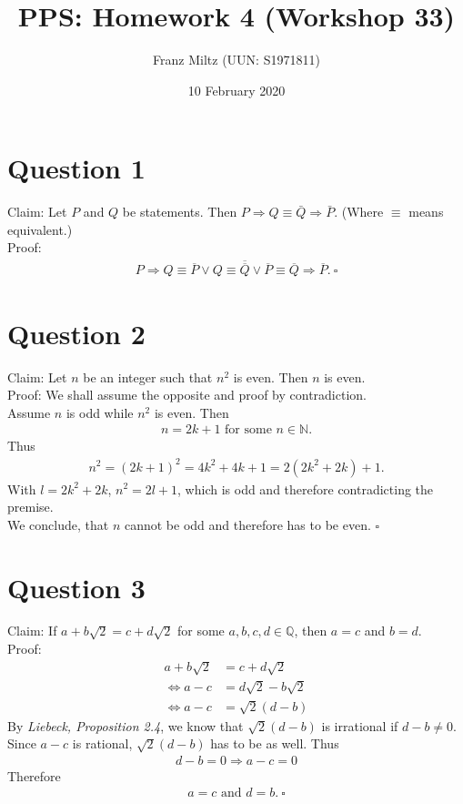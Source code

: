 \documentclass{article}
\title{PPS: Homework 4 (Workshop 33)}
\author{Franz Miltz (UUN: S1971811)}
\date{10 February 2020}
\begin{document}
\maketitle
\section*{Question 1}
Claim: Let $P$ and $Q$ be statements. Then $P\Rightarrow Q\equiv \bar{Q}\Rightarrow \bar{P}$. (Where $\equiv$ means equivalent.)\\
Proof:
\begin{align*}
	P\Rightarrow Q\equiv\overline{P}\vee Q\equiv \overline{\overline{Q}}\vee \overline{P}\equiv\overline{Q}\Rightarrow\overline{P}.\:\square
\end{align*}
\section*{Question 2}
Claim: Let $n$ be an integer such that $n^2$ is even. Then $n$ is even.\\
Proof: We shall assume the opposite and proof by contradiction.\\
Assume $n$ is odd while $n^2$ is even. Then
\begin{align*}
	n=2k+1 \text{ for some } n\in\mathbb{N}.
\end{align*}
Thus
\begin{align*}
	n^2=(2k+1)^2=4k^2+4k+1=2(2k^2+2k)+1.
\end{align*}
With $l=2k^2+2k$, $n^2=2l+1$, which is odd and therefore contradicting the premise.\\
We conclude, that $n$ cannot be odd and therefore has to be even. $\square$
\section*{Question 3}
Claim: If $a+b\sqrt{2}=c+d\sqrt{2}$ for some $a,b,c,d\in\mathbb{Q}$, then $a=c$ and $b=d$.\\
Proof:
\begin{align*}
	a+b\sqrt{2}         & =c+d\sqrt{2}         \\
	\Leftrightarrow a-c & =d\sqrt{2}-b\sqrt{2} \\
	\Leftrightarrow a-c & =\sqrt{2}(d-b)
\end{align*}
By \emph{Liebeck, Proposition 2.4}, we know that $\sqrt{2}(d-b)$ is irrational if $d-b\not=0$. Since $a-c$ is rational, $\sqrt{2}(d-b)$ has to be as well. Thus
\begin{align*}
	d-b=0 \Rightarrow a-c=0
\end{align*}
Therefore
\begin{align*}
	a=c \text{ and } d=b.\:\square
\end{align*}
\end{document}
